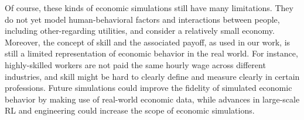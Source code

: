 Of course, these kinds of economic simulations still have many limitations. They do not yet model human-behavioral factors and interactions between people, including other-regarding utilities, and consider a relatively small economy.
Moreover, the concept of skill and the associated payoff, as used in our work, is still a limited representation of economic behavior in the real world. For instance, highly-skilled workers are not paid the same hourly wage across different industries, and skill might be hard to clearly define and measure clearly in certain professions.
Future simulations could improve the fidelity of simulated economic behavior by making use of real-world economic data, while advances in large-scale RL and engineering could increase the scope of economic simulations.



